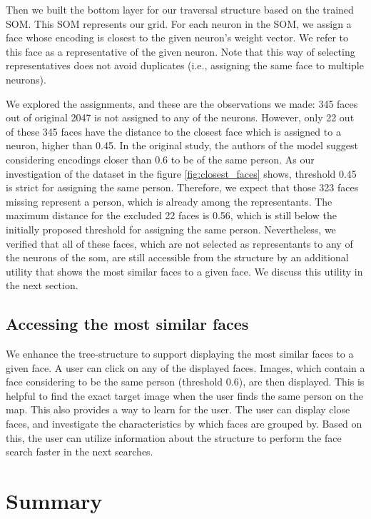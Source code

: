 Then we built the bottom layer for our traversal structure based on the trained SOM. This SOM represents our grid. For each neuron in the SOM, we assign a face whose encoding is closest to the given neuron's weight vector. We refer to this face as a representative of the given neuron.
Note that this way of selecting representatives does not avoid duplicates (i.e., assigning the same face to multiple neurons). 

We explored the assignments, and these are the observations we made: 345 faces out of original 2047 is not assigned to any of the neurons. However, only 22 out of these 345 faces have the distance to the closest face which is assigned to a neuron, higher than 0.45. In the original study, the authors of the model suggest considering encodings closer than 0.6 to be of the same person. As our investigation of the dataset in the figure \ref{fig:closest_faces} shows, threshold 0.45 is strict for assigning the same person. Therefore, we expect that those 323 faces missing represent a person, which is already among the representants. The maximum distance for the excluded 22 faces is 0.56, which is still below the initially proposed threshold for assigning the same person. Nevertheless, we verified that all of these faces, which are not selected as representants to any of the neurons of the \acrshort{som}, are still accessible from the structure by an additional utility that shows the most similar faces to a given face. We discuss this utility in the next section.

\subsection{Accessing the most similar faces}

We enhance the tree-structure to support displaying the most similar faces to a given face. A user can click on any of the displayed faces. Images, which contain a face considering to be the same person (threshold 0.6), are then displayed. This is helpful to find the exact target image when the user finds the same person on the map. This also provides a way to learn for the user. The user can display close faces, and investigate the characteristics by which faces are grouped by. Based on this, the user can utilize information about the structure to perform the face search faster in the next searches.

\section{Summary}

